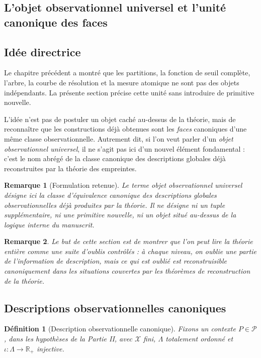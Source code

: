 \documentclass[11pt,a4paper]{article}
\newtheorem{definition}{Définition}
\newtheorem{remark}{Remarque}
\begin{document}
\begin{appendices}
\section{L'objet observationnel universel et l'unité canonique des faces}

\subsection{Idée directrice}

Le chapitre précédent a montré que les partitions, la fonction de seuil complète, l'arbre, la courbe de résolution et la mesure atomique ne sont pas des objets indépendants.  
La présente section précise cette unité sans introduire de primitive nouvelle.

L'idée n'est pas de postuler un objet caché au-dessus de la théorie, mais de reconnaître que les constructions déjà obtenues sont les \emph{faces} canoniques d'une même classe observationnelle.  
Autrement dit, si l'on veut parler d'un \emph{objet observationnel universel}, il ne s'agit pas ici d'un nouvel élément fondamental : c'est le nom abrégé de la classe canonique des descriptions globales déjà reconstruites par la théorie des empreintes.

\begin{remark}[Formulation retenue]
Le terme \emph{objet observationnel universel} désigne ici la classe d'équivalence canonique des descriptions globales observationnelles déjà produites par la théorie. Il ne désigne ni un tuple supplémentaire, ni une primitive nouvelle, ni un objet situé au-dessus de la logique interne du manuscrit.
\end{remark}

\begin{remark}
Le but de cette section est de montrer que l'on peut lire la théorie entière comme une suite d'oublis contrôlés : à chaque niveau, on oublie une partie de l'information de description, mais ce qui est oublié est reconstruisible canoniquement dans les situations couvertes par les théorèmes de reconstruction de la théorie.
\end{remark}

\subsection{Descriptions observationnelles canoniques}

\begin{definition}[Description observationnelle canonique]
Fixons un contexte \(P\in\mathcal P\), dans les hypothèses de la Partie II, avec \(\mathcal X\) fini, \(\Lambda\) totalement ordonné et \(\iota:\Lambda\to\mathbb R_+\) injective.


\end{definition}
\end{appendices}
\end{document}
